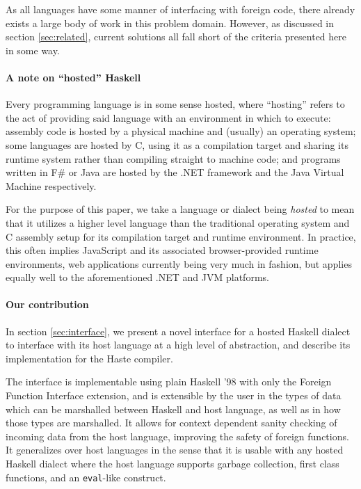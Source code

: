 \documentclass{sigplanconf}
\begin{document}
As all languages have some manner of interfacing with foreign code, there
already exists a large body of work in this problem domain. However, as
discussed in section \ref{sec:related}, current solutions all fall short of
the criteria presented here in some way.

\paragraph{A note on ``hosted'' Haskell}
Every programming language is in some sense hosted, where ``hosting'' refers
to the act of providing said language with an environment in which to execute:
assembly code is hosted by a physical machine and (usually) an operating
system; some languages are hosted by C, using it as a compilation target and
sharing its runtime system rather than compiling straight to machine code;
and programs written in F\# or Java are hosted by the .NET framework and the
Java Virtual Machine respectively.

For the purpose of this paper, we take a language or dialect being
\emph{hosted} to mean that it utilizes a higher level language than the
traditional operating system and C assembly setup for its compilation target
and runtime environment. In practice, this often implies JavaScript and its
associated browser-provided runtime environments, web applications currently
being very much in fashion, but applies equally well to the aforementioned
.NET and JVM platforms.

\paragraph{Our contribution}\label{sec:contrib}
In section \ref{sec:interface}, we present a novel interface for a hosted
Haskell dialect to interface with its host language at a high level of
abstraction, and describe its implementation for the Haste compiler.
\ \cite{haste}

The interface is implementable using plain Haskell '98 with only the Foreign
Function Interface extension, and is extensible by the user in the types of
data which can be marshalled between Haskell and host language, as well as in
how those types are marshalled. It allows for context dependent sanity
checking of incoming data from the host language, improving the safety
of foreign functions. It generalizes over host languages in the sense that it
is usable with any hosted Haskell dialect where the host language supports
garbage collection, first class functions, and an \lstinline!eval!-like
construct.
\end{document}
